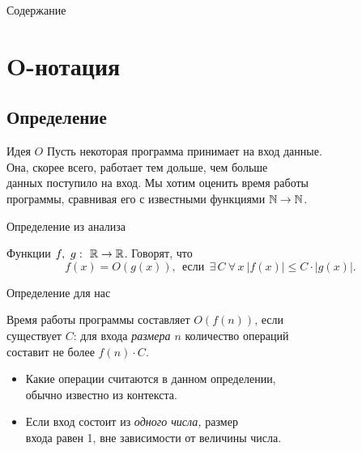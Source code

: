 \documentclass[12pt,aspectratio=169,svgnames]{beamer}
\begin{document}
 \maketitle

\begin{frame}{Содержание}
	\tableofcontents
\end{frame}

\section{O-нотация}

\subsection{Определение}

\begin{frame}{Идея \(O\)}
	Пусть некоторая программа принимает на вход данные. \\
	Она, скорее всего, работает тем дольше, чем больше \\
	данных поступило на вход. Мы хотим оценить время работы \\
	программы, сравнивая его с известными функциями \(\mathbb{N} \to \mathbb{N}\).
\end{frame}


\begin{frame}{Определение из анализа}
\begin{defn}
	Функции \(f,\ g\,\colon\ \mathbb{R} \to \mathbb{R}\). Говорят, что
		\[f(x) = O(g(x)),\ \ \text{если}\ \ \exists\,C\ \forall\,x\ 
			|f(x)| \le C \cdot |g(x)|. \]
\end{defn}
\end{frame}


\begin{frame}{Определение для нас} \ \\
\begin{defn}
	Время работы программы составляет \(O(f(n))\), если \\
	существует \(C\): для входа {\it размера \(n\)} количество операций \\
	составит не более \(f(n) \cdot C\).
\end{defn}

\begin{itemize}
	\item Какие операции считаются в данном определении, \\
	      обычно известно из контекста.
	\item Если вход состоит из {\it одного числа,} размер \\
	      входа равен 1, вне зависимости от величины числа.
\end{itemize}
\end{frame}
\end{document}
